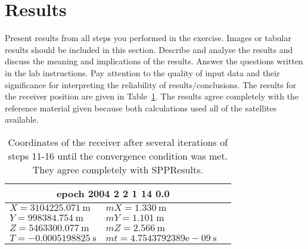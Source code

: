 \section{Results} %
\label{sec:results}

Present results from all steps you performed in the exercise. Images or tabular results should be included in this section. Describe and analyse the results and discuss the meaning and implications of the results. Answer the questions written in the lab instructions. Pay attention to the quality of input data and their significance for interpreting the reliability of results/conclusions.
The results for the receiver position are given in Table~\ref{tab:receiverCoordinates}.  The results agree completely with the reference material given because both calculations used all of the satellites available.
\begin{table}[h]
	\begin{center}
		\begin{tabular}{llr}
		\toprule
		\multicolumn{2}{c}{epoch 2004 2 2 1 14 0.0} \\
		\midrule
			$X = 3104225.071~\text{m}$	& $mX =$$   1.330~\text{m}$		\\
			$Y = 998384.754~\text{m}$	& $mY =   1.101~\text{m}$		\\
			$Z = 5463300.077~\text{m}$	& $mZ =   2.566~\text{m}$		\\
			$T = -0.0005198825~\text{s}$ 	& $mt = 4.7543792389\text{e}-09~\text{s}$		\\
		\bottomrule
		\end{tabular}
	\end{center}
	\caption{Coordinates of the receiver after several iterations of steps 11-16 until the convergence condition was met.  They agree completely with SPPResults.}
	\label{tab:receiverCoordinates}
\end{table}


